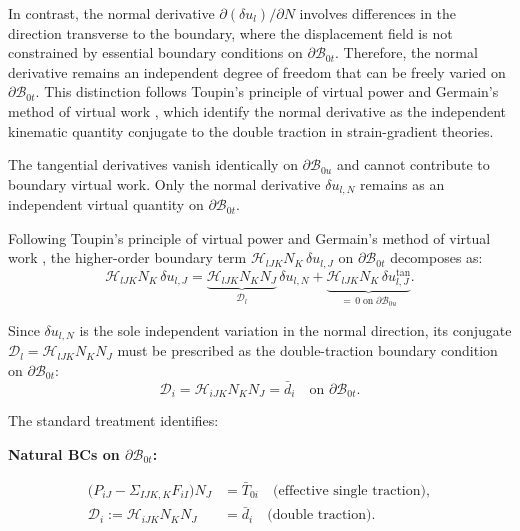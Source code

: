 \documentclass[11pt]{article}
\begin{document}
In contrast, the normal derivative $\partial(\delta u_l)/\partial N$ involves differences in the direction transverse to the boundary, where the displacement field is not constrained by essential boundary conditions on $\partial\mathcal{B}_{0t}$. Therefore, the normal derivative remains an independent degree of freedom that can be freely varied on $\partial\mathcal{B}_{0t}$. This distinction follows Toupin's principle of virtual power \cite{Toupin1964} and Germain's method of virtual work \cite{Germain1973}, which identify the normal derivative as the independent kinematic quantity conjugate to the double traction in strain-gradient theories.

The tangential derivatives vanish identically on $\partial\mathcal{B}_{0u}$ and cannot contribute to boundary virtual work. Only the normal derivative $\delta u_{l,N}$ remains as an independent virtual quantity on $\partial\mathcal{B}_{0t}$.

Following Toupin's principle of virtual power \cite{Toupin1964} and Germain's method of virtual work \cite{Germain1973}, the higher-order boundary term $\mathcal{H}_{lJK}N_K\,\delta u_{l,J}$ on $\partial\mathcal{B}_{0t}$ decomposes as:
\begin{equation}
\mathcal{H}_{lJK}N_K\,\delta u_{l,J} = \underbrace{\mathcal{H}_{lJK}N_KN_J}_{\mathcal{D}_l}\,\delta u_{l,N} + \underbrace{\mathcal{H}_{lJK}N_K\,\delta u_{l,J}^{\mathrm{tan}}}_{=\,0\;\text{on}\;\partial\mathcal{B}_{0u}}.
\end{equation}

Since $\delta u_{l,N}$ is the sole independent variation in the normal direction, its conjugate $\mathcal{D}_l = \mathcal{H}_{lJK}N_KN_J$ must be prescribed as the double-traction boundary condition on $\partial\mathcal{B}_{0t}$:
\begin{equation}
\mathcal{D}_i = \mathcal{H}_{iJK}N_KN_J = \bar{d}_i \quad \text{on } \partial\mathcal{B}_{0t}.
\end{equation}

The standard treatment \cite{Toupin1964,Germain1973} identifies:

\textbf{Natural BCs on $\partial\mathcal{B}_{0t}$:}

\begin{align}
\bigl(P_{iJ}-\Sigma_{IJK,K}F_{iI}\bigr)N_J &= \bar{T}_{0i}
\quad\text{(effective single traction)},
\\
\mathcal{D}_{i} := \mathcal{H}_{iJK}N_KN_J &= \bar{d}_{i}
\quad\text{(double traction)}.
\end{align}
\end{document}
